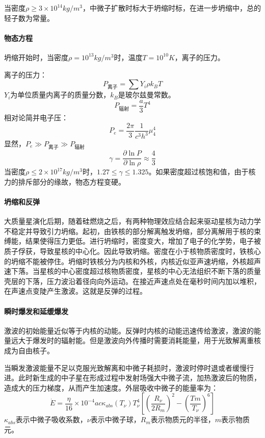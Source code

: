 当密度$\rho\geq 3\times 10^{14}kg/m^3$，中微子扩散时标大于坍缩时标，在进一步坍缩中，总的轻子数为常量。
\paragraph{物态方程}
坍缩开始时，当密度$\rho=10^{13}kg/m^3$时，温度$T=10^{10}K$，离子的压力。

离子的压力：
\begin{equation}
	P_{\mbox{离子}}=\sum Y_{i}\rho k_{B}T
\end{equation}
$Y_{i}$为单位质量内离子的质量分数，$k_{B}$是玻尔兹曼常数。
\begin{equation}
	P_{\mbox{辐射}}=\frac{a}{3}T^4
\end{equation}
相对论简并电子压：
\begin{equation}
	P_{e}=\frac{2\pi}{3}\frac{1}{c^3h^3}\mu_{4}^4
\end{equation}
显然，$P_{e}\gg P_{\mbox{离子}}\gg P_{\mbox{辐射}}$
\begin{equation}
	\gamma =\frac{\partial \ln P}{\partial \ln \rho }\approx \frac{4}{3}
\end{equation}
当密度$\rho \leq 2\times 10^{17}kg/m^3$时，$1.27\leq \gamma \leq 1.325$。如果密度超过核饱和值，由于核力的排斥部分的缘故，物态方程变硬。
\paragraph{坍缩和反弹}大质量星演化后期，随着硅燃烧之后，有两种物理效应结合起来驱动星核为动力学不稳定并导致引力坍缩。起初，由铁核的部分解离触发坍缩，部分离解用于核的束缚能，结果使得压力更低。进行坍缩时，密度变大，增加了电子的化学势，电子被质子俘获，导致星核的中心化。因此导致坍缩。密度在小于核物质密度时，铁核心的坍缩不能被停住。坍缩时铁核分为内核和外核，内核近似亚声速坍缩，外核超声速下落。当星核的中心密度超过核物质密度，星核的中心无法组织不断下落的质量壳层的下落，压力波沿着径向向外运动。在接近声速点处在毫秒时间内加以堆积，在声速点变陡产生激波。这就是反弹的过程。
\paragraph{瞬时爆发和延缓爆发}激波的初始能量近似等于内核的动能。反弹时内核的动能迅速传给激波，激波的能量远大于爆发时的辐射能。但是激波向外传播时需要消耗能量，用于光致解离重核成为自由核子。

当瞬发激波能量不足以克服光致解离和中微子耗损时，激波时停时退或者缓慢行进。此时新生成的中子星在形成过程中发射场强大中微子流，加热激波后的物质，造成大的压力梯度，从而产生加速度。外层吸收中微子的能量率为：
\begin{equation}
	\dot{E}=\frac{\eta}{16}\times 10^{-4}ac\kappa_{abs}(T_{\nu})T_{\nu}^4\left[\left(\frac{R_{\nu}}{2R_{m}}\right)^2-\left(\frac{Tm}{T_{\nu}}\right)^6\right] 
\end{equation}
$\kappa_{abs}$表示中微子吸收系数，$\nu$表示中微子球，$R_{m}$表示物质元的半径，$m$表示物质元。
